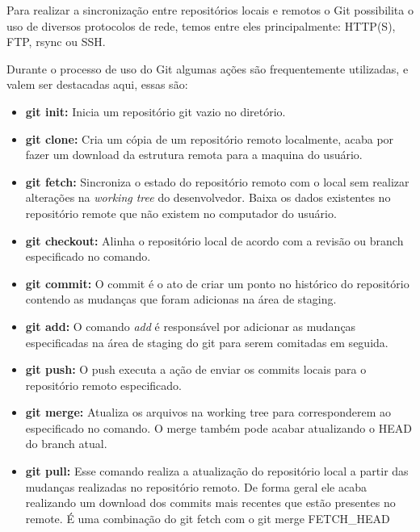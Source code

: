 	Para realizar a sincronização entre repositórios locais e remotos o Git possibilita o uso de diversos protocolos de rede, temos entre eles principalmente: HTTP(S), FTP, rsync ou SSH.
	
	Durante o processo de uso do Git algumas ações são frequentemente utilizadas, e valem ser destacadas aqui, essas são:
	\begin{itemize}
    	\item \textbf{git init:} 
    	Inicia um repositório git vazio no diretório.
    	
    	\item \textbf{git clone:}
    	Cria um cópia de um repositório remoto localmente, acaba por fazer um download da estrutura remota para a maquina do usuário.
    	
    	\item \textbf{git fetch:}
	    Sincroniza o estado do repositório remoto com o local sem realizar alterações na \textit{working tree} do desenvolvedor. Baixa os dados existentes no repositório remote que não existem no computador do usuário.
	
    	\item \textbf{git checkout:}
    	Alinha o repositório local de acordo com a revisão ou branch especificado no comando.
    	
    	\item \textbf{git commit:}
    	O commit é o ato de criar um ponto no histórico do repositório contendo as mudanças que foram adicionas na área de staging.
    	
    	\item \textbf{git add:}
    	O comando \textit{add} é responsável por adicionar as mudanças especificadas na área de staging do git para serem comitadas em seguida.
    	
    	\item \textbf{git push:}
    	O push executa a ação de enviar os commits locais para o repositório remoto especificado.
    	
    	\item \textbf{git merge:}
    	Atualiza os arquivos na working tree para corresponderem ao especificado no comando. O merge também pode acabar atualizando o HEAD do branch atual.
    	
    	\item \textbf{git pull:}
    	Esse comando realiza a atualização do repositório local a partir das mudanças realizadas no repositório remoto. De forma geral ele acaba realizando um download dos commits mais recentes que estão presentes no remote. É uma combinação do git fetch com o git merge FETCH\_HEAD
	\end{itemize}
